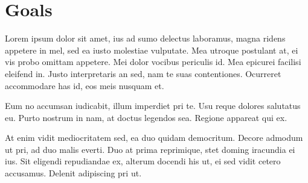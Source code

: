 \section{Goals}

Lorem ipsum dolor sit amet, ius ad sumo delectus laboramus, magna ridens appetere in mel, sed ea iusto molestiae vulputate. Mea utroque postulant at, ei vis probo omittam appetere. Mei dolor vocibus periculis id. Mea epicurei facilisi eleifend in. Justo interpretaris an sed, nam te suas contentiones. Ocurreret accommodare has id, eos meis nusquam et.

Eum no accumsan iudicabit, illum imperdiet pri te. Usu reque dolores salutatus eu. Purto nostrum in nam, at doctus legendos sea. Regione appareat qui ex.

At enim vidit mediocritatem sed, ea duo quidam democritum. Decore admodum ut pri, ad duo malis everti. Duo at prima reprimique, stet doming iracundia ei ius. Sit eligendi repudiandae ex, alterum docendi his ut, ei sed vidit cetero accusamus. Delenit adipiscing pri ut.